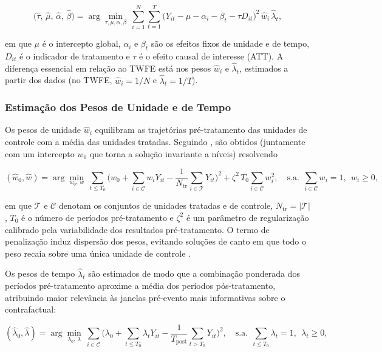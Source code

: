 \documentclass[a4paper,12pt]{article}
\begin{document}
\begin{equation}
\big(\hat{\tau},\, \hat{\mu},\, \hat{\alpha},\, \hat{\beta}\big) =
\arg\min_{\tau,\mu,\alpha,\beta}\ \sum_{i=1}^{N}\sum_{t=1}^{T}
\big(Y_{it} - \mu - \alpha_i - \beta_t - \tau D_{it}\big)^2\, \hat{w}_i\, \hat{\lambda}_t,
\end{equation}

em que $\mu$ é o intercepto global, $\alpha_i$ e $\beta_t$ são os efeitos fixos de unidade
e de tempo, $D_{it}$ é o indicador de tratamento e $\tau$ é o efeito causal de interesse
(ATT). A diferença essencial em relação ao TWFE está nos pesos $\hat{w}_i$ e
$\hat{\lambda}_t$, estimados a partir dos dados (no TWFE, $\hat{w}_i = 1/N$ e
$\hat{\lambda}_t = 1/T$).

\subsubsection{Estimação dos Pesos de Unidade e de Tempo}

Os pesos de unidade $\hat{w}_i$ equilibram as trajetórias pré-tratamento das unidades de
controle com a média das unidades tratadas. Seguindo , são
obtidos (juntamente com um intercepto $w_0$ que torna a solução invariante a níveis)
resolvendo

\begin{equation}
(\hat{w}_0, \hat{w}) = \arg\min_{w_0,\, w}\
\sum_{t \le T_0} \Bigg( w_0 + \sum_{i \in \mathcal{C}} w_i Y_{it}
- \frac{1}{N_{\mathrm{tr}}}\sum_{i \in \mathcal{T}} Y_{it} \Bigg)^2
+ \zeta^2\, T_0 \sum_{i \in \mathcal{C}} w_i^2,
\quad \text{s.a.}\ \ \sum_{i \in \mathcal{C}} w_i = 1,\ \ w_i \ge 0,
\end{equation}

em que $\mathcal{T}$ e $\mathcal{C}$ denotam os conjuntos de unidades tratadas e de
controle, $N_{\mathrm{tr}} = |\mathcal{T}|$, $T_0$ é o número de períodos pré-tratamento
e $\zeta^2$ é um parâmetro de regularização calibrado pela variabilidade dos resultados
pré-tratamento. O termo de penalização induz dispersão dos pesos, evitando soluções de
canto em que todo o peso recaia sobre uma única unidade de controle
\cite{arkhangelsky2021}.

Os pesos de tempo $\hat{\lambda}_t$ são estimados de modo que a combinação ponderada
dos períodos pré-tratamento aproxime a média dos períodos pós-tratamento, atribuindo
maior relevância às janelas pré-evento mais informativas sobre o contrafactual:

\begin{equation}
(\hat{\lambda}_0, \hat{\lambda}) = \arg\min_{\lambda_0,\, \lambda}\
\sum_{i \in \mathcal{C}} \Bigg( \lambda_0 + \sum_{t \le T_0} \lambda_t Y_{it}
- \frac{1}{T_{\mathrm{post}}}\sum_{t > T_0} Y_{it} \Bigg)^2,
\quad \text{s.a.}\ \ \sum_{t \le T_0} \lambda_t = 1,\ \ \lambda_t \ge 0,
\end{equation}
\end{document}

